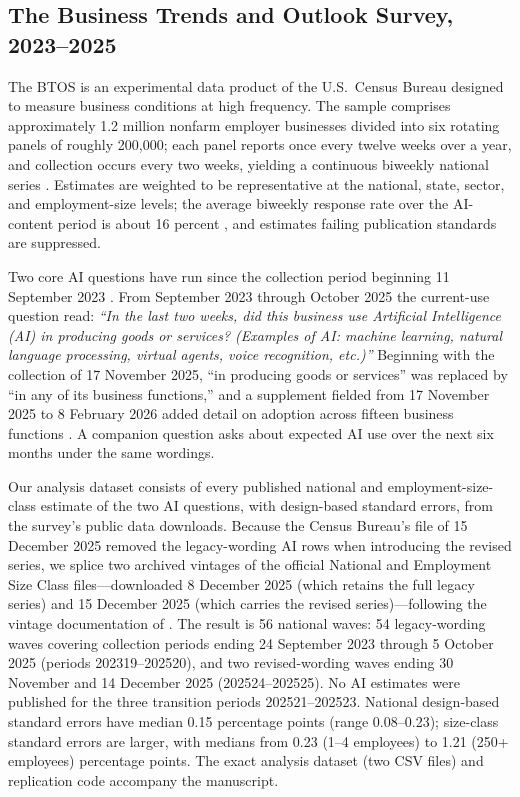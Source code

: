 \documentclass[review,authoryear,12pt]{elsarticle}
\begin{document}
\subsection{The Business Trends and Outlook Survey, 2023--2025}
\label{sec:btosdata}

The BTOS is an experimental data product of the U.S.\ Census Bureau designed to measure business conditions at high frequency. The sample comprises approximately 1.2 million nonfarm employer businesses divided into six rotating panels of roughly 200,000; each panel reports once every twelve weeks over a year, and collection occurs every two weeks, yielding a continuous biweekly national series \citep{censusmethod2025,census2026pr}. Estimates are weighted to be representative at the national, state, sector, and employment-size levels; the average biweekly response rate over the AI-content period is about 16 percent \citep{bonney2024}, and estimates failing publication standards are suppressed.

Two core AI questions have run since the collection period beginning 11 September 2023 \citep{bonney2024}. From September 2023 through October 2025 the current-use question read: \emph{``In the last two weeks, did this business use Artificial Intelligence (AI) in producing goods or services? (Examples of AI: machine learning, natural language processing, virtual agents, voice recognition, etc.)''} Beginning with the collection of 17 November 2025, ``in producing goods or services'' was replaced by ``in any of its business functions,'' and a supplement fielded from 17 November 2025 to 8 February 2026 added detail on adoption across fifteen business functions \citep{census2026pr}. A companion question asks about expected AI use over the next six months under the same wordings.

Our analysis dataset consists of every published national and employment-size-class estimate of the two AI questions, with design-based standard errors, from the survey's public data downloads. Because the Census Bureau's file of 15 December 2025 removed the legacy-wording AI rows when introducing the revised series, we splice two archived vintages of the official National and Employment Size Class files---downloaded 8 December 2025 (which retains the full legacy series) and 15 December 2025 (which carries the revised series)---following the vintage documentation of \citet{goldschlag2025}. The result is 56 national waves: 54 legacy-wording waves covering collection periods ending 24 September 2023 through 5 October 2025 (periods 202319--202520), and two revised-wording waves ending 30 November and 14 December 2025 (202524--202525). No AI estimates were published for the three transition periods 202521--202523. National design-based standard errors have median 0.15 percentage points (range 0.08--0.23); size-class standard errors are larger, with medians from 0.23 (1--4 employees) to 1.21 (250+ employees) percentage points. The exact analysis dataset (two CSV files) and replication code accompany the manuscript.
\end{document}
